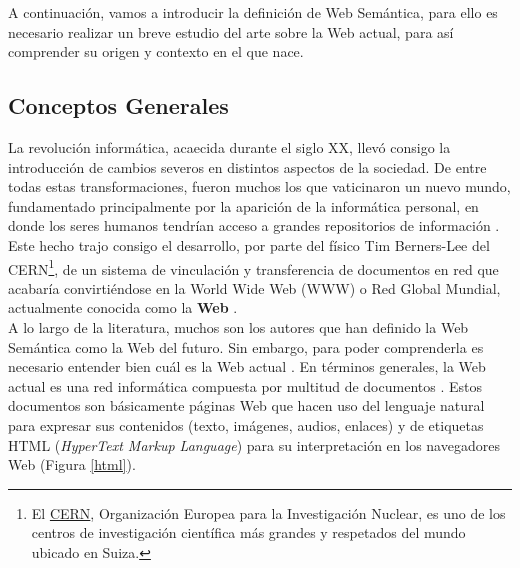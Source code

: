 A continuación, vamos a introducir la definición de Web Semántica, para ello es necesario realizar un breve estudio del arte sobre la Web actual, para así comprender su origen y contexto en el que nace.

\subsection{Conceptos Generales}


La revolución informática, acaecida durante el siglo XX, llevó consigo la introducción de cambios severos en distintos aspectos de la sociedad. De entre todas estas transformaciones, fueron muchos los que vaticinaron un nuevo mundo, fundamentado principalmente por la aparición de la informática personal, en donde los seres humanos tendrían acceso a grandes repositorios de información \cite{semantica-web}. Este hecho trajo consigo el desarrollo, por parte del físico Tim Berners-Lee del CERN\footnote{El \href{https://home.cern}{CERN}, Organización Europea para la Investigación Nuclear, es uno de los centros de investigación científica más grandes y respetados del mundo ubicado en Suiza.}, de un sistema de vinculación y transferencia de documentos en red que acabaría convirtiéndose en la World Wide Web (WWW) o Red Global Mundial, actualmente conocida como la \textbf{Web} \cite{tesis}.\\

A lo largo de la literatura, muchos son los autores que han definido la Web Semántica como la Web del futuro. Sin embargo, para poder comprenderla es necesario entender bien cuál es la Web actual \cite{researchgate}. En términos generales, la Web actual es una red informática compuesta por multitud de documentos \cite{coursera}. Estos documentos son básicamente páginas Web que hacen uso del lenguaje natural para expresar sus contenidos (texto, imágenes, audios, enlaces) y de etiquetas HTML (\textit{HyperText Markup Language}) para su interpretación en los navegadores Web (Figura \ref{html}). 


